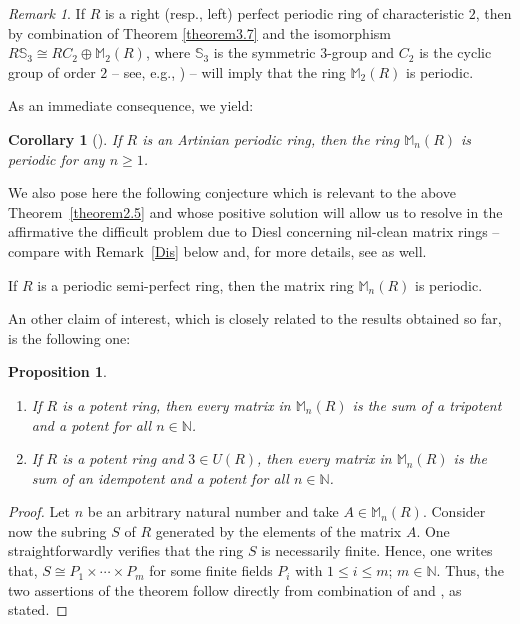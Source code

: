 \documentclass[12pt]{amsart}
\newtheorem{cor}[thm]{Corollary}
\newtheorem{prop}[thm]{Proposition}
\theoremstyle{definition}
\theoremstyle{remark}
\newtheorem{rem}[thm]{Remark}
\numberwithin{equation}{section}
\begin{document}
\begin{rem}
If $R$ is a right (resp., left) perfect periodic ring of characteristic $2$, then by combination of Theorem \ref{theorem3.7} and the isomorphism $R\mathbb{S}_3 \cong RC_2 \oplus \mathbb{M}_2(R)$, where $\mathbb{S}_3$ is the symmetric $3$-group and $C_2$ is the cyclic group of order $2$  -- see, e.g., \cite[Lemma 4.4]{morphicgrouprings}) -- will imply that the ring $\mathbb{M}_2(R)$ is periodic.
\end{rem}

As an immediate consequence, we yield:

\begin{cor}[{\cite[Proposition 2.18]{BCL}}]\label{corollary2.6}
If $R$ is an Artinian periodic ring, then the ring $\mathbb{M}_n(R)$ is periodic for any $n \geq 1$.
\end{cor}

\medskip

We also pose here the following conjecture which is relevant to the above Theorem~\ref{theorem2.5} and whose positive solution will allow us to resolve in the affirmative the difficult problem due to Diesl concerning nil-clean matrix rings -- compare with Remark~\ref{Dis} below and, for more details, see \cite{D13} as well.

\medskip

 If $R$ is a periodic semi-perfect ring, then the matrix ring $\mathbb{M}_n(R)$ is periodic.

\medskip

An other claim of interest, which is closely related to the results obtained so far, is the following one:

\begin{prop}\label{sumpotents}
\begin{enumerate}
\item[\rm{(1)}] If $R$ is a potent ring, then every matrix in $\mathbb{M}_n(R)$ is the sum of a tripotent and a potent for all $n\in \mathbb{N}$.
\item[\rm{(2)}] If $R$ is a potent ring and $3\in U(R)$, then every matrix in $\mathbb{M}_n(R)$ is the sum of an idempotent and a potent for all $n\in \mathbb{N}$.
\end{enumerate}
\end{prop}

\begin{proof} Let $n$ be an arbitrary natural number and take $A\in \mathbb{M}_{n}(R)$. Consider now the subring $S$ of $R$ generated by the elements of the matrix $A$. One straightforwardly verifies that the ring $S$ is necessarily finite. Hence, one writes that, $S\cong P_{1} \times \cdots \times P_{m}$ for some finite fields $P_{i}$ with $1\leq i \leq m$; $m\in \mathbb{N}$. Thus, the two assertions of the theorem follow directly from combination of \cite[Theorem 1]{laa-2021} and \cite[Theorem 14]{smz-2021}, as stated.
\end{proof}
\end{document}
